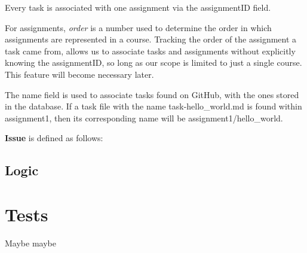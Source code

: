 

Every task is associated with one assignment via the assignmentID field.

For assignments, \textit{order} is a number used to determine the order in which assignments are represented in a course.
Tracking the order of the assignment a task came from, allows us to associate tasks and assignments without explicitly knowing the assignmentID, so long as our scope is limited to just a single course.
This feature will become necessary later.

The name field is used to associate tasks found on GitHub, with the ones stored in the database.
If a task file with the name task-hello\_world.md is found within assignment1, then its corresponding name will be assignment1/hello\_world.

\textbf{Issue} is defined as follows:



\subsection{Logic}


\section{Tests}

Maybe maybe